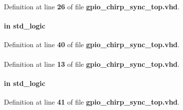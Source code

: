 Definition at line {\bf 26} of file {\bf gpio\+\_\+chirp\+\_\+sync\+\_\+top.\+vhd}.

\paragraph[{ddr\+\_\+en}]{ {\bfseries \textcolor{keywordflow}{in}\textcolor{vhdlchar}{ }} {\bfseries \textcolor{comment}{std\+\_\+logic}\textcolor{vhdlchar}{ }} \hspace{0.3cm}{\ttfamily [Port]}}\label{classgpio__chirp__sync__top_adbfe05e6692f69f8e592df06c6055f0a}


Definition at line {\bf 40} of file {\bf gpio\+\_\+chirp\+\_\+sync\+\_\+top.\+vhd}.

\paragraph[{ieee}]{\hspace{0.3cm}{\ttfamily [Library]}}\label{classgpio__chirp__sync__top_a0a6af6eef40212dbaf130d57ce711256}


Definition at line {\bf 13} of file {\bf gpio\+\_\+chirp\+\_\+sync\+\_\+top.\+vhd}.

\paragraph[{mimo\+\_\+en}]{ {\bfseries \textcolor{keywordflow}{in}\textcolor{vhdlchar}{ }} {\bfseries \textcolor{comment}{std\+\_\+logic}\textcolor{vhdlchar}{ }} \hspace{0.3cm}{\ttfamily [Port]}}\label{classgpio__chirp__sync__top_a0c57670aee4f9fbfa3c286573012965a}


Definition at line {\bf 41} of file {\bf gpio\+\_\+chirp\+\_\+sync\+\_\+top.\+vhd}.

